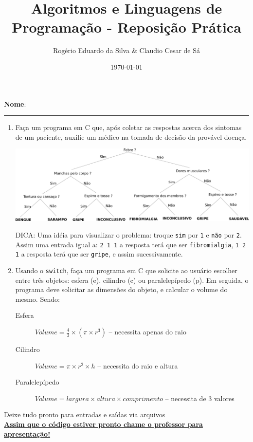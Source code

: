 \documentclass[12pt]{article}
\title{Algoritmos e Linguagens de Programação - Reposição Prática}
\author{Rogério Eduardo da Silva \& Claudio Cesar de Sá}
\date{\today}
\begin{document}
\maketitle



\begin{flushleft}
\textbf{Nome}: \rule{10cm}{0.3mm} 
\end{flushleft}

\vskip 0.5cm


\begin{enumerate}

\item Faça um programa em C que, após coletar as respostas acerca dos sintomas de um paciente, auxilie um médico na tomada de decisão da provável 
doença.
\begin{center}
\includegraphics[width=\linewidth]{img/doencas}
\end{center}

{\footnotesize DICA: Uma idéia para visualizar o problema: troque \texttt{sim} por \texttt{1} e \texttt{não} por \texttt{2}. Assim uma entrada igual a: 
\texttt{2 1 1} a resposta terá que ser \texttt{fibromialgia},
\texttt{1 2 1} a resposta terá que ser \texttt{gripe}, e assim sucessivamente.}

\item Usando o \texttt{switch}, faça um programa em C que solicite ao usuário escolher entre três objetos: esfera (e), cilindro (c) ou paralelepípedo (p). 
Em seguida, o programa deve solicitar  as dimensões do objeto, e calcular o volume do mesmo. Sendo:
\begin{description}
\item[Esfera] $Volume = \frac{4}{3} \times \left ( \pi \times r^3 \right )$ -- necessita apenas do raio

\item[Cilindro] $Volume = \pi \times r^2 \times h$
 -- necessita  do raio e altura

\item[Paralelepípedo] $Volume = largura \times altura \times comprimento$  -- necessita de 3 valores

\end{description}

\end{enumerate}
\begin{center}

{\Large Deixe tudo pronto para entradas e saídas via arquivos}\\


\underline{\textbf{Assim que o código estiver pronto chame o professor para apresentação!}}



\end{center}
\end{document}
